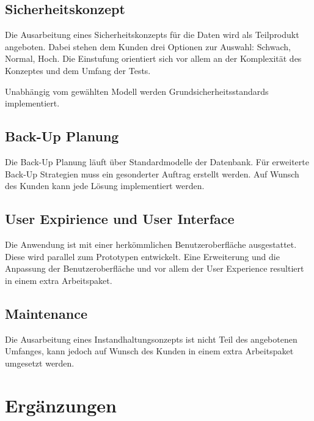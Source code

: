 	\subsection{Sicherheitskonzept}
	
	Die Ausarbeitung eines Sicherheitskonzepts für die Daten wird als Teilprodukt angeboten. Dabei stehen dem Kunden drei Optionen zur Auswahl: Schwach, Normal, Hoch. 
	Die Einstufung orientiert sich vor allem an der Komplexität des Konzeptes und dem Umfang der Tests. 
	
	Unabhängig vom gewählten Modell werden  Grundsicherheitsstandards implementiert.
	
	\subsection{Back-Up Planung}
	
	Die Back-Up Planung läuft über Standardmodelle der Datenbank. Für erweiterte Back-Up Strategien muss ein gesonderter Auftrag erstellt werden. Auf Wunsch des Kunden kann jede Lösung implementiert werden.
	
	\subsection{User Expirience und User Interface}
	
	Die Anwendung ist mit einer herkömmlichen Benutzeroberfläche ausgestattet. Diese wird parallel zum Prototypen entwickelt. Eine Erweiterung und die Anpassung der Benutzeroberfläche und vor allem der User Experience resultiert in einem extra Arbeitspaket.
	
	
	\subsection{Maintenance}
	
	Die Ausarbeitung eines Instandhaltungsonzepts ist nicht Teil des angebotenen Umfanges, kann jedoch auf Wunsch des Kunden in einem extra Arbeitspaket umgesetzt werden.
	
	\section{Ergänzungen}
		
	
	
